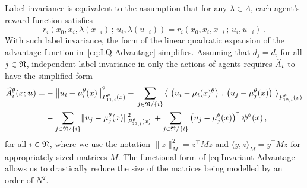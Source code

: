 \documentclass[onefignum,onetabnum]{siamonline171218}
\begin{document}
Label invariance is equivalent to the assumption that for any $\lambda\in\Lambda$, each agent's reward function satisfies
\begin{equation}
	r_i \left(
	x_0 , x_i , \lambda(x_{-i})
	\, ; \,
	u_i , \lambda(u_{-i})
	\right)
	=
	r_i \left(
	x_0 , x_i , x_{-i}
	\, ; \,
	u_i , u_{-i}
	\right)
	\;.
\end{equation}
With such label invariance,  the form of the linear quadratic expansion of the advantage function in~\eqref{eq:LQ-Advantage} simplifies. Assuming that $d_j = d$, for all $j\in{\mathfrak{N}}$, independent label invariance in only the actions of agents requires $\widehat{A}_i$ to have the simplified form
\begin{equation} \label{eq:Invariant-Advantage}
	\begin{aligned}
		\Ahat_i^{\theta} (x;\bu) =
		&- \left\| u_i - \mu_i^{\theta}(x) \right\|_{P^{\theta}_{11,i}(x)}^{2}
		- \, \sum_{j\in\mfN/\{i\}}
		\left\langle  \; \left(u_i - \mu_i(x)^{\theta}\right) \, , \,
		 \left(u_j - \mu_j^{\theta}(x)\right) \; \right\rangle_{P^{\theta}_{12,i}(x)}
		\\
		&- \sum_{j\in\mfN/\{i\}} \lVert u_j - \mu_j^{\theta}(x) \rVert^{2}_{P^{\theta}_{22,i}(x)}
		\,+ \sum_{j\in\mfN/\{i\}} \left(u_j - \mu_j^{\theta}(x)\right)^\intercal \bpsi^{\theta}(x)\,,
	\end{aligned}
\end{equation}
for all $ i\in{\mathfrak{N}}$,
where we use the notation $\|z\|^2_{M} = z^{\intercal} M z$ and $\langle y, z \rangle_M = y^{\intercal} M z$ for appropriately sized matrices $M$. 
The functional form of \eqref{eq:Invariant-Advantage} allows us to drastically reduce the size of the matrices being modelled by an order of $N^2$.
\end{document}
